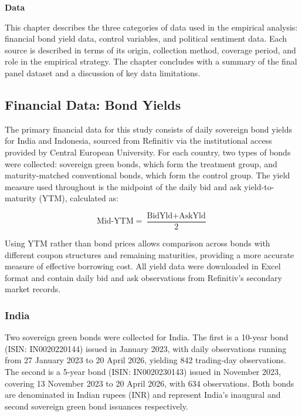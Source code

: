\documentclass[12pt,a4paper]{article}
\begin{document}
\setcounter{section}{2}
\setcounter{subsection}{0}
\setcounter{subsubsection}{0} 
\noindent
{\Large\bfseries \thesection \quad Data}
\vspace{6pt}

This chapter describes the three categories of data used in the empirical analysis: financial bond yield data, control variables, and political sentiment data. Each source is described in terms of its origin, collection method, coverage period, and role in the empirical strategy. The chapter concludes with a summary of the final panel dataset and a discussion of key data limitations.

\subsection{Financial Data: Bond Yields}

The primary financial data for this study consists of daily sovereign bond yields for India and Indonesia, sourced from Refinitiv via the institutional access provided by Central European University. For each country, two types of bonds were collected: sovereign green bonds, which form the treatment group, and maturity-matched conventional bonds, which form the control group. The yield measure used throughout is the midpoint of the daily bid and ask yield-to-maturity (YTM), calculated as:

\begin{equation}
\text{Mid-YTM} = \frac{\text{BidYld} + \text{AskYld}}{2}
\end{equation}

Using YTM rather than bond prices allows comparison across bonds with different coupon structures and remaining maturities, providing a more accurate measure of effective borrowing cost. All yield data were downloaded in Excel format and contain daily bid and ask observations from Refinitiv's secondary market records.

\subsubsection{India}

Two sovereign green bonds were collected for India. The first is a 10-year bond (ISIN: IN0020220144) issued in January 2023, with daily observations running from 27 January 2023 to 20 April 2026, yielding 842 trading-day observations. The second is a 5-year bond (ISIN: IN0020230143) issued in November 2023, covering 13 November 2023 to 20 April 2026, with 634 observations. Both bonds are denominated in Indian rupees (INR) and represent India's inaugural and second sovereign green bond issuances respectively.
\end{document}
